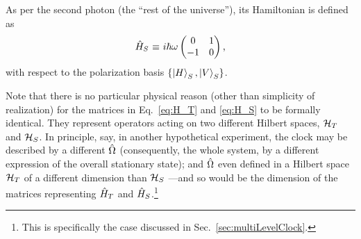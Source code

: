 As per the second photon (the ``rest of the universe''),
its Hamiltonian is defined as
\begin{equation}\label{eq:H_S}
  \hat{H}_S \operatorname*{\,\equiv\,} {
    i\hbar\omega
    \begin{pmatrix}
      0 & 1 \\
     -1 & 0
    \end{pmatrix}
  } \, \text{,}
\end{equation}
with respect to the polarization basis $\qty{\ket{H}_S, \ket{V}_S}$.

Note that there is no particular physical reason
(other than simplicity of realization)
for the matrices in Eq.~\eqref{eq:H_T} and \eqref{eq:H_S} to be formally identical.
They represent operators acting on two different Hilbert spaces, $\mathcal{H}_T$ and $\mathcal{H}_S$.
  In principle, say, in another hypothetical experiment,
  the clock may be described by a different $\hat{\Omega}$
  (consequently, the whole system, by a different expression of the overall stationary state);
  and $\hat{\Omega}$ even defined in a Hilbert space $\mathcal{H}_T$ of a different dimension than $\mathcal{H}_S$
  ---and so would be the dimension of the matrices representing $\hat{H}_T$ and $\hat{H}_S$.\footnote{
    This is specifically the case discussed in Sec.~\ref{sec:multiLevelClock}.
  }

